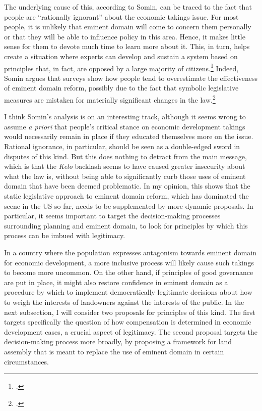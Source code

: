 \documentclass[12pt,a4paper]{book} %
\begin{document}
The underlying cause of this, according to Somin, can be traced to the fact that people are ``rationally ignorant'' about the economic takings issue. For most people, it is unlikely that eminent domain will come to concern them personally or that they will be able to influence policy in this area. Hence, it makes little sense for them to devote much time to learn more about it. This, in turn, helps create a situation where experts can develop and sustain a system based on principles that, in fact, are opposed by a large majority of citizens.\footcite[2163-2171]{somin09} Indeed, Somin argues that surveys show how people tend to overestimate the effectiveness of eminent domain reform, possibly due to the fact that symbolic legislative measures are mistaken for materially significant changes in the law.\footcite{somin09}

I think Somin's analysis is on an interesting track, although it seems wrong to assume {\it a priori} that people's critical stance on economic development takings would necessarily remain in place if they educated themselves more on the issue. Rational ignorance, in particular, should be seen as a double-edged sword in disputes of this kind. But this does nothing to detract from the main message, which is that the {\it Kelo} backlash seems to have caused greater insecurity about what the law is, without being able to significantly curb those uses of eminent domain that have been deemed problematic. In my opinion, this shows that the static legislative approach to eminent domain reform, which has dominated the scene in the US so far, needs to be supplemented by more dynamic proposals. In particular, it seems important to target the decision-making processes surrounding planning and eminent domain, to look for principles by which this process can be imbued with legitimacy. 

In a country where the population expresses antagonism towards eminent domain for economic development, a more inclusive process will likely cause such takings to become more uncommon. On the other hand, if principles of good governance are put in place, it might also restore confidence in eminent domain as a procedure by which to implement democratically legitimate decisions about how to weigh the interests of landowners against the interests of the public. In the next subsection, I will consider two proposals for principles of this kind. The first targets specifically the question of how compensation is determined in economic development cases, a crucial aspect of legitimacy. The second proposal targets the decision-making process more broadly, by proposing a framework for land assembly that is meant to replace the use of eminent domain in certain circumstances.
\end{document}
